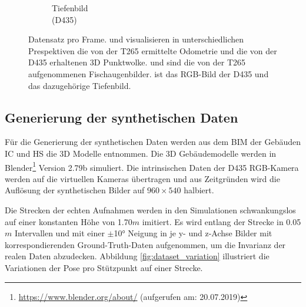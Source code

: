 \begin{figure}[H]
\begin{subfigure}[t]{0.3\linewidth}
		\caption{Tiefenbild \\ (D435) \hspace*{2cm}}
		\label{subfig:depth-image}
	\end{subfigure}
	\caption{Datensatz pro Frame.   und  visualisieren in unterschiedlichen Prespektiven die von der T265 ermittelte Odometrie und die von der D435 erhaltenen 3D Punktwolke.  und  sind die von der T265 aufgenommenen Fischaugenbilder.  ist das RGB-Bild der D435 und  das dazugehörige Tiefenbild. }
	\label{fig:dataset}
\end{figure}

\subsection{Generierung der synthetischen Daten}
\label{subsec:generate_synth_images}
Für die Generierung der synthetischen Daten werden aus dem BIM der Gebäuden IC und HS die 3D Modelle entnommen. Die 3D Gebäudemodelle werden in Blender\footnote{\url{https://www.blender.org/about/} (aufgerufen am: 20.07.2019)} Version 2.79b simuliert. Die intrinsischen Daten der D435 RGB-Kamera werden auf die virtuellen Kameras übertragen und aus Zeitgründen wird die Auflösung der synthetischen Bilder auf  $960\times540$ halbiert.

Die Strecken der echten Aufnahmen werden in den Simulationen schwankungslos auf einer konstanten Höhe von 1.70$m$ imitiert.%
Es wird entlang der Strecke in 0.05$m$ Intervallen und mit einer $\pm$10° Neigung in je y- und z-Achse Bilder mit korrespondierenden Ground-Truth-Daten aufgenommen, um die Invarianz der realen Daten abzudecken. Abbildung \ref{fig:dataset_variation} illustriert die Variationen der Pose pro Stützpunkt auf einer Strecke.


